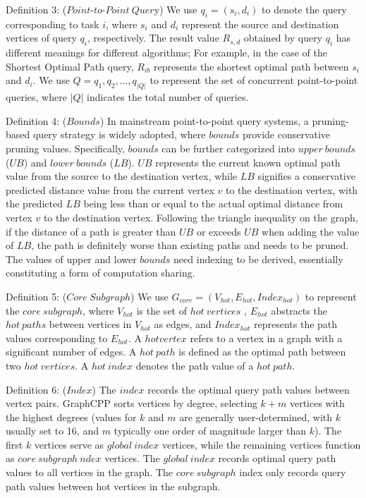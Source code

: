 \documentclass[lettersize,journal]{IEEEtran} %
\begin{document}
Definition 3: ($Point \text{-} to \text{-} Point~Quer$y) We use $q_i=(s_i,d_i)$ to denote the query corresponding to task $i$, where $s_i$ and $d_i$ represent the source and destination vertices of query $q_i$, respectively. The result value $R_{s,d}$ obtained by query $q_i$ has different meanings for different algorithms; For example, in the case of the Shortest Optimal Path query, $R_{ib}$ represents the shortest optimal path between $s_i$ and $d_i$. We use $Q={q_1,q_2,\ldots,q_{|Q|}}$ to represent the set of concurrent point-to-point queries, where $|Q|$ indicates the total number of queries.

Definition 4: ($Bounds$) In mainstream point-to-point query systems, a pruning-based query strategy is widely adopted, where $bounds$ provide conservative pruning values. Specifically, $bounds$ can be further categorized into $upper~bounds$ ($UB$) and $lower~bounds$ ($LB$). $UB$ represents the current known optimal path value from the source to the destination vertex, while $LB$ signifies a conservative predicted distance value from the current vertex $v$ to the destination vertex, with the predicted $LB$ being less than or equal to the actual optimal distance from vertex $v$ to the destination vertex. Following the triangle inequality on the graph, if the distance of a path is greater than $UB$ or exceeds $UB$ when adding the value of $LB$, the path is definitely worse than existing paths and needs to be pruned. The values of upper and lower $bounds$ need indexing to be derived, essentially constituting a form of computation sharing.

Definition 5: ($Core~Subgraph$) We use $G_{core}=(V_{hot},E_{hot},Index_{hot})$ to represent the $core~subgraph$, where $V_{hot}$ is the set of $hot~vertices$ , $E_{hot}$ abstracts the $hot~paths$ between vertices in $V_{hot}$ as edges, and $Index_{hot}$ represents the path values corresponding to $E_{hot}$. A $hot vertex$ refers to a vertex in a graph with a significant number of edges. A $hot~path$ is defined as the optimal path between two $hot~vertices$. A $hot~index$ denotes the path value of a $hot~path$.

Definition 6: ($Index$) The $index$ records the optimal query path values between vertex pairs. GraphCPP sorts vertices by degree, selecting $k+m$ vertices with the highest degrees (values for $k$ and $m$ are generally user-determined, with $k$ usually set to 16, and $m$ typically one order of magnitude larger than $k$). The first $k$ vertices serve as $global~index$ vertices, while the remaining vertices function as $core~subgraph~ndex$ vertices. The $global~index$ records optimal query path values to all vertices in the graph. The $core~subgraph$ index only records query path values between hot vertices in the subgraph.
\end{document}
